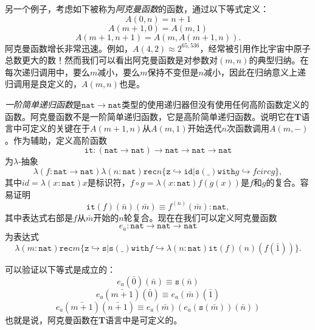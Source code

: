 另一个例子，考虑如下被称为\textit{阿克曼函数}的函数，通过以下等式定义：
\begin{equation*}
A(0,n)=n+1
\end{equation*}
\begin{equation*}
A(m+1,0)=A(m,1)
\end{equation*}
\begin{equation*}
A(m+1,n+1)=A(m,A(m+1,n)).
\end{equation*}
阿克曼函数增长非常迅速。例如，$A(4,2)\approx2^{65,536}$，经常被引用作比宇宙中原子总数更大的数！然而我们可以看出阿克曼函数是对参数对$(m,n)$的典型归纳。在每次递归调用中，要么$m$减小，要么$m$保持不变但是$n$减小，因此在归纳意义上递归调用是良定义的，$A(m,n)$也是。

\textit{一阶简单递归函数}是$\mathtt{nat}\to\mathtt{nat}$类型的使用递归器但没有使用任何高阶函数定义的函数。阿克曼函数不是一阶简单递归函数，它是高阶简单递归函数。说明它在\textbf{T}语言中可定义的关键在于$A(m+1,n)$从$A(m,1)$开始迭代$n$次函数调用$A(m,-)$。作为辅助，定义高阶函数
\begin{equation*}
\mathtt{it}:(\mathtt{nat}\to\mathtt{nat})\to\mathtt{nat}\to\mathtt{nat}\to\mathtt{nat}
\end{equation*}
为$\lambda$-抽象
\begin{equation*}
\lambda(f:\mathtt{nat}\to\mathtt{nat})\lambda(n:\mathtt{nat})\mathtt{rec}n\{\mathtt{z}\hookrightarrow\mathtt{id}|\mathtt{s}(\_)\mathtt{with}g\hookrightarrow fcirc g\},
\end{equation*}
其中$id=\lambda(x:\mathtt{nat})x$是标识符，$f\circ g=\lambda(x:\mathtt{nat})f(g(x))$是$f$和$g$的复合。容易证明
\begin{equation*}
\mathtt{it}(f)(\bar{n})(\bar{m})\equiv f^{(n)}(\bar{m}):\mathtt{nat},
\end{equation*}
其中表达式右部是$f$从$\bar{m}$开始的$n$轮复合。现在在我们可以定义阿克曼函数
\begin{equation*}
e_a:\mathtt{nat}\to\mathtt{nat}\to\mathtt{nat}
\end{equation*}
为表达式
\begin{equation*}
\lambda(m:\mathtt{nat})\mathtt{rec}m\{\mathtt{z}\hookrightarrow\mathtt{s}|\mathtt{s}(\_)\mathtt{with}f\hookrightarrow\lambda(n:\mathtt{nat})\mathtt{it}(f)(n)(f(\bar{1}))\}.
\end{equation*}

可以验证以下等式是成立的：
\begin{equation}
e_a(\bar{0})(\bar{n})\equiv\mathtt{s}(\bar{n})
\end{equation}
\begin{equation}
e_a(\bar{m+1})(\bar{0})\equiv e_a(\bar{m})(\bar{1})
\end{equation}
\begin{equation}
e_a(\bar{m+1})(\bar{n+1})\equiv e_a(\bar{m})(e_a(\mathtt{s}(\bar{m}))(\bar{n}))
\end{equation}
也就是说，阿克曼函数在\textbf{T}语言中是可定义的。

